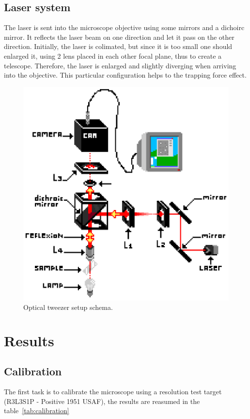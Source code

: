 \documentclass[a4paper,12pt,twoside]{article}	%
\begin{document}
\subsection{Laser system}
The laser is sent into the microscope objective using some mirrors and a dichoirc mirror. It reflects the laser beam on one direction and let it pass on the other direction.
Initially, the laser is colimated, but since it is too small one should enlarged it, using 2 lens placed in each other focal plane, thus to create a telescope. Therefore, the laser is enlarged and slightly diverging when arriving into the objective. This particular configuration helps to the trapping force effect.

\begin{figure}[h]
	\begin{center}
		\includegraphics[width=0.8\linewidth,angle=0]{./figures/montage_1}
		\caption{Optical tweezer setup schema.} \label{fig:dispositif}
	\end{center}
\end{figure}

\section{Results}
\subsection{Calibration}
The first task is to calibrate the microscope using a resolution test target (R3L3S1P - Positive 1951 USAF), the results are reasumed in the table~\ref{tab:calibration}
\end{document}
